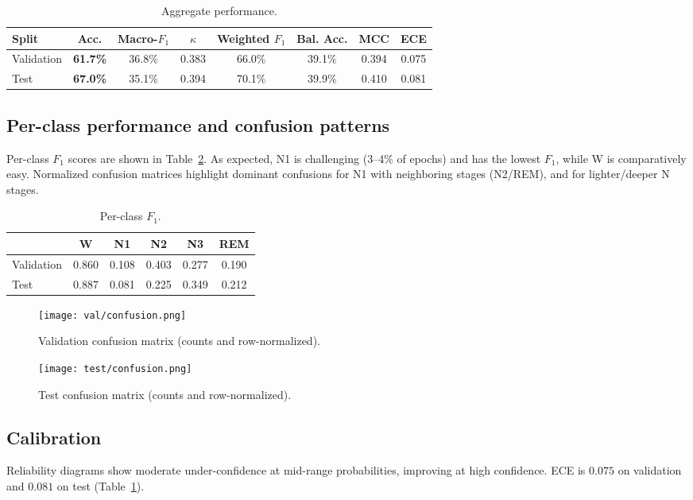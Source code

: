 \documentclass{article}
\begin{document}
\begin{table}[t]
\centering
\caption{Aggregate performance.}
\label{tab:overall}
\small
\begin{tabular}{lccccccc}
\toprule
Split & Acc. & Macro-\(F_1\) & \(\kappa\) & Weighted \(F_1\) & Bal. Acc. & MCC & ECE \\
\midrule
Validation & \textbf{61.7\%} & 36.8\% & 0.383 & 66.0\% & 39.1\% & 0.394 & 0.075 \\
Test       & \textbf{67.0\%} & 35.1\% & 0.394 & 70.1\% & 39.9\% & 0.410 & 0.081 \\
\bottomrule
\end{tabular}
\end{table}

\subsection{Per-class performance and confusion patterns}
Per-class \(F_1\) scores are shown in Table~\ref{tab:perclass}. As expected, N1 is challenging (3--4\% of epochs) and has the lowest \(F_1\), while W is comparatively easy. Normalized confusion matrices highlight dominant confusions for N1 with neighboring stages (N2/REM), and for lighter/deeper N stages.

\begin{table}[t]
\centering
\caption{Per-class \(F_1\).}
\label{tab:perclass}
\small
\begin{tabular}{lccccc}
\toprule
& W & N1 & N2 & N3 & REM \\
\midrule
Validation & 0.860 & 0.108 & 0.403 & 0.277 & 0.190 \\
Test       & 0.887 & 0.081 & 0.225 & 0.349 & 0.212 \\
\bottomrule
\end{tabular}
\end{table}

\begin{figure}[t]
  \centering
  \texttt{[image: val/confusion.png]}
  \caption{Validation confusion matrix (counts and row-normalized).}
  \label{fig:confmat-val}
\end{figure}

\begin{figure}[t]
  \centering
  \texttt{[image: test/confusion.png]}
  \caption{Test confusion matrix (counts and row-normalized).}
  \label{fig:confmat-test}
\end{figure}

\subsection{Calibration}
Reliability diagrams show moderate under-confidence at mid-range probabilities, improving at high confidence. ECE is \(0.075\) on validation and \(0.081\) on test (Table~\ref{tab:overall}).
\end{document}
